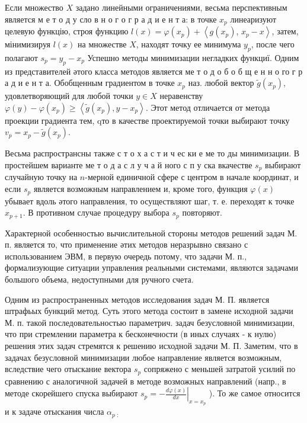 \documentclass[10pt]{article}
\begin{document}
Если множество $X$ задано линейными ограничениями, весьма перспективным является м е т о д у сло в н о г о г р а д и е н т а: в точке $x_{p}$ линеаризуют целевую функцію, строя функцию $l(x)=\varphi\left(x_{p}\right)+\left\langle g\left(x_{p}\right)\right.$, $\left.x_{p}-x\right\rangle$, затем, мінимизируя $l(x)$ на множестве $X$, находят точку ее минимума $y_{p}$, после чего полагают $s_{p}=y_{p}-x_{p}$ Успешно методы минимизации негладких функциї. Одним из представителей әтого класса методов является ме т о д о б о б щ е н н о го г р а д и е н т а. Обобщенным градиентом в точке $x_{p}$ наз. любой вектор $\tilde{g}\left(x_{p}\right)$, удовлетворяющий для любой точки $y \in X$ неравенству $\varphi(y)-\varphi\left(x_{p}\right) \geqslant\left\langle\tilde{g}\left(x_{p}\right), y-x_{p}\right\rangle$. Этот метод отличается от метода проекции градиента тем, qто в качестве проектируемой точки выбирают точку $v_{p}=x_{p}-\tilde{g}\left(x_{p}\right)$.



Весьма распространсны также с т о х а с т и ч ес ки е ме то ды минимизации. В простейшем варианте ме т о д а с л у ч а й ного с п у ска вкачестве $s_{p}$ выбирают случайную точку на $n$-мерной единичной сфере с центром в начале координат, и если $s_{p}$ является возможным направлением и, кроме того, функция $\varphi(x)$ убывает вдоль әтого направления, то осуществляют шаг, т. е. переходят к точке $x_{p+1}$. В противном случае процедуру выбора $s_{p}$ повторяют.



Характерной особенностью вычислительной стороны методов решений задач М. п. является то, что применение әтих методов неразрывно связано с использованием ЭВМ, в первую очередь потому, что задачи М. п., формализующие ситуации управления реальными системами, являются задачами большого объема, недоступными для ручного счета.



Одним из распространенных методов исследования задач М. П. является штрафьых бункций метод. Суть этого метода состоит в замене исходной задачи М. п. такой последовательностью параметрич. задач безусловной минимизации, что при стремлении параметра к бесконечности (в иных случаях - к нулю) решения этих задач стремятся к решению исходной задачи М. П. Заметим, что в задачах безусловной минимизации любое направление является возможным, вследствие чего отыскание вектора $s_{p}$ сопряжено с меньшей затратой усилий по сравнению с аналогичной задачей в методе возможных направлений (напр., в методе скорейшего спуска выбирают $s_{p}=-\left.\frac{d \varphi(x)}{d x}\right|_{x=x_{p}}$ ). То же самое относится и к задаче отыскания числа $\alpha_{p \text { : }}$
\end{document}
